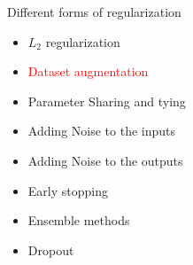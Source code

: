 \begin{frame}
\end{frame}

\begin{frame}
\vspace{4em}
	\begin{overlayarea}{\textwidth}{\textheight}
		\begin{block}{Different forms of regularization}
			\begin{itemize}
				\item $L_2$ regularization
				\item \textcolor<2->{red}{Dataset augmentation}
				\item Parameter Sharing and tying
				\item Adding Noise to the inputs 
				\item Adding Noise to the outputs 
				\item Early stopping
				\item Ensemble methods
				\item Dropout
			\end{itemize}
		\end{block}
	\end{overlayarea}
\end{frame}
\begin{frame}
	\begin{columns}
		\begin{center}
			
		\end{center}
					
	\end{columns}    
\end{frame}
		
